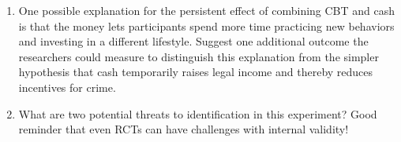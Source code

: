 \documentclass[12pt]{article}
\begin{document}
\begin{enumerate}
\item One possible explanation for the persistent effect of combining CBT and cash is that the money lets participants spend more time practicing new behaviors and investing in a different lifestyle. Suggest one additional outcome the researchers could measure to distinguish this explanation from the simpler hypothesis that cash temporarily raises legal income and thereby reduces incentives for crime.
\vspace{4cm}
\vspace{8ex}

\item What are two potential threats to identification in this experiment? Good reminder that even RCTs can have challenges with internal validity!
\vspace{4cm}
%
%
\vspace{8ex}


\end{enumerate}
\end{document}
